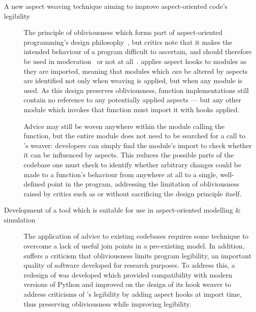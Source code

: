 \begin{description}

  \item[A new aspect weaving technique aiming to improve aspect-oriented code's legibility]
    The principle of obliviousness which forms part of aspect-oriented
    programming's design
    philosophy~\cite{filman2000aspect,kell2008survey,Charfi2006AspectOrientedWL},
    but critics note that it makes the intended behaviour of a program difficult
    to ascertain, and should therefore be used in
    moderation~\cite{leavens2007multiple} or not at
    all~\cite{przybylek2010wrong,Constantinides04aopconsidered}. \pdsf{} applies
    aspect hooks to modules as they are imported, meaning that modules which
    \emph{can} be altered by aspects are identified not only when weaving is
    applied, but when any module is used. As this design preserves
    obliviousness, function implementations still contain no reference to any
    potentially applied aspects --- but any other module which invokes that function
    must import it with hooks applied.

    Advice may still be woven anywhere within the module calling the function,
    but the entire module does not need to be searched for a call to \pdsf{}'s
    weaver: developers can simply find the module's import to check whether it
    can be influenced by aspects. This reduces the possible parts of the
    codebase one must check to identify whether arbitrary changes could be made
    to a function's behaviour from anywhere at all to a single, well-defined
    point in the program, addressing the limitation of obliviousness raised by
    critics such as \citet{leavens2007multiple} or
    \citet{Constantinides04aopconsidered} without sacrificing the design
    principle itself.


  \item[Development of a tool which is suitable for use in aspect-oriented
    modelling \& simulation] The application of advice to existing codebases
    requires some technique to overcome a lack of useful join points in a
    pre-existing model. In addition, \aop{} suffers a criticism that
    obliviousness limits program legibility, an important quality of software
    developed for research purposes. To address this, a redesign of \pdsf{} was
    developed which provided compatibility with modern versions of Python and
    improved on the design of its hook weaver to address criticisms of \aop{}'s
    legibility by adding aspect hooks at import time, thus preserving
    obliviousness while improving legibility.


\end{description}
